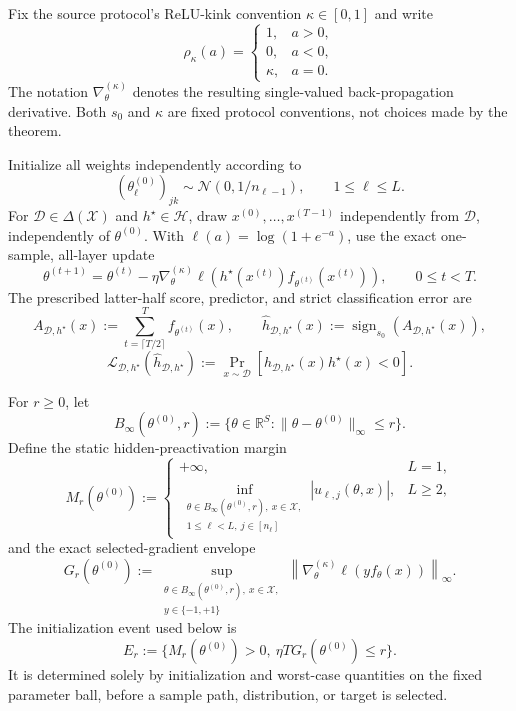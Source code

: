 Fix the source protocol's ReLU-kink convention $\kappa\in[0,1]$ and write
\[
\rho_\kappa(a)=
\begin{cases}
1,&a>0,\\
0,&a<0,\\
\kappa,&a=0.
\end{cases}
\]
The notation $\nabla_\theta^{(\kappa)}$ denotes the resulting single-valued
back-propagation derivative.  Both $s_0$ and $\kappa$ are fixed protocol
conventions, not choices made by the theorem.

Initialize all weights independently according to
\[
(\theta_\ell^{(0)})_{jk}\sim\mathcal N(0,1/n_{\ell-1}),
\qquad 1\leq\ell\leq L.
\tag{3}\label{eq:p1-i3-eq003}
\]
For $\mathcal D\in\Delta(\mathcal X)$ and $h^\star\in\mathcal H$, draw
$x^{(0)},\ldots,x^{(T-1)}$ independently from $\mathcal D$, independently
of $\theta^{(0)}$.  With $\ell(a)=\log(1+e^{-a})$, use the exact one-sample,
all-layer update
\[
\theta^{(t+1)}=\theta^{(t)}-
\eta\nabla_\theta^{(\kappa)}
\ell\!\left(h^\star(x^{(t)})f_{\theta^{(t)}}(x^{(t)})\right),
\qquad 0\leq t<T.
\tag{4}\label{eq:p1-i3-eq004}
\]
The prescribed latter-half score, predictor, and strict classification error
are
\[
A_{\mathcal D,h^\star}(x)
:=\sum_{t=\lceil T/2\rceil}^{T}f_{\theta^{(t)}}(x),
\qquad
\widehat h_{\mathcal D,h^\star}(x)
:=\operatorname{sign}_{s_0}(A_{\mathcal D,h^\star}(x)),
\tag{5}\label{eq:p1-i3-eq005}
\]
\[
\mathcal L_{\mathcal D,h^\star}
(\widehat h_{\mathcal D,h^\star})
:=\Pr_{x\sim\mathcal D}\!\left[
\widehat h_{\mathcal D,h^\star}(x)h^\star(x)<0
\right].
\tag{6}\label{eq:p1-i3-eq006}
\]

For $r\geq0$, let
\[
B_\infty(\theta^{(0)},r)
:=\{\theta\in\mathbb R^S:
\|\theta-\theta^{(0)}\|_\infty\leq r\}.
\tag{7}\label{eq:p1-i3-eq007}
\]
Define the static hidden-preactivation margin
\[
M_r(\theta^{(0)}):=
\begin{cases}
+\infty,&L=1,\\[1mm]
\displaystyle
\inf_{\substack{\theta\in B_\infty(\theta^{(0)},r),\ x\in\mathcal X,\\
1\leq\ell<L,\ j\in[n_\ell]}}
|u_{\ell,j}(\theta,x)|,&L\geq2,
\end{cases}
\tag{8}\label{eq:p1-i3-eq008}
\]
and the exact selected-gradient envelope
\[
G_r(\theta^{(0)}):=
\sup_{\substack{\theta\in B_\infty(\theta^{(0)},r),\ x\in\mathcal X,\\
y\in\{-1,+1\}}}
\left\|\nabla_\theta^{(\kappa)}\ell(yf_\theta(x))\right\|_\infty.
\tag{9}\label{eq:p1-i3-eq009}
\]
The initialization event used below is
\[
E_r:=\{M_r(\theta^{(0)})>0,
\ \eta T G_r(\theta^{(0)})\leq r\}.
\tag{10}\label{eq:p1-i3-eq010}
\]
It is determined solely by initialization and worst-case quantities on the
fixed parameter ball, before a sample path, distribution, or target is
selected.

